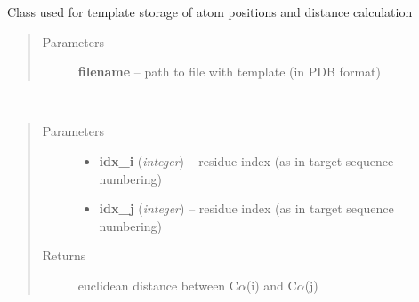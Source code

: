 \documentclass[letterpaper,10pt,english]{sphinxmanual}
\begin{document}
\begin{fulllineitems}
\label{api:pycabs.Template}
Class used for template storage of atom positions and distance calculation
\begin{quote}\begin{description}
\item[{Parameters}] \leavevmode
\textbf{filename} -- path to file with template (in PDB format)

\end{description}\end{quote}

\begin{fulllineitems}
\label{api:pycabs.Template.distance}~\begin{quote}\begin{description}
\item[{Parameters}] \leavevmode\begin{itemize}
\item {} 
\textbf{idx\_i} (\emph{integer}) -- residue index (as in target sequence numbering)

\item {} 
\textbf{idx\_j} (\emph{integer}) -- residue index (as in target sequence numbering)

\end{itemize}

\item[{Returns}] \leavevmode
euclidean distance between C\(\alpha\)(i) and C\(\alpha\)(j)

\end{description}\end{quote}

\end{fulllineitems}


\end{fulllineitems}

\end{document}
